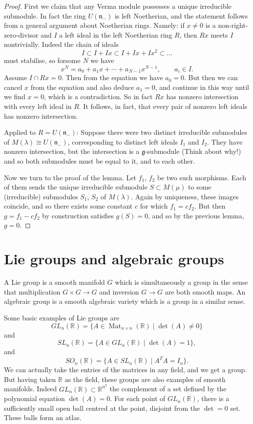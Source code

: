 \documentclass[12pt]{article}
\theoremstyle{plain}
\theoremstyle{definition}
\numberwithin{equation}{section}
\DeclareMathOperator{\Mat}{Mat}
\newcommand{\la}{\lambda}
\newcommand{\R}{\mathbb{R}}
\newcommand{\g}{\mathfrak{g}}
\newcommand{\n}{\mathfrak{n}}
\begin{document}
\begin{proof}
First we claim that any Verma module possesses a unique irreducible submodule. In fact the ring $U(\n_-)$ is left Noetherian, and the statement follows from a general argument about Noetherian rings. Namely: if $x \neq 0$ is a non-right-zero-divisor and $I$ a left ideal in the left Noetherian ring $R$, then $Rx$ meets $I$ nontrivially. Indeed the chain of ideals
\[
I \subset I + Ix \subset I + Ix + Ix^2 \subset \ldots
\]
must stabilise, so forsome $N$ we have
\[
x^N = a_0 + a_1 x + \cdots + a_{N-1} x^{N-1}, \qquad a_i \in I.
\]
Assume $I \cap Rx = 0$. Then from the equation we have $a_0 = 0$. But then we can cancel $x$ from the equation and also deduce $a_1 = 0$, and continue in this way until we find $x = 0$, which is a contradiction. So in fact $Rx$ has nonzero intersection with every left ideal in $R$. It follows, in fact, that every pair of nonzero left ideals has nonzero intersection.

Applied to $R = U(\n_-)$: Suppose there were two distinct irreducible submodules of $M(\la) \cong U(\n_-)$, corresponding to distinct left ideals $I_1$ and $I_2$. They have nonzero intersection, but the intersection is a $\g$-submodule (Think about why!) and so both submodules must be equal to it, and to each other.

Now we turn to the proof of the lemma. Let $f_1$, $f_2$ be two such morphisms. Each of them sends the unique irreducible submodule $S \subset M(\mu)$ to some (irreducible) submodules $S_1$, $S_2$ of $M(\la)$. Again by uniqueness, these images coincide, and so there exists some constant $c$ for which $f_1 = c f_2$. But then $g = f_1 - cf_2$ by construction satisfies $g(S) = 0$, and so by the previous lemma, $g = 0$.
\end{proof}





\section{Lie groups and algebraic groups}


A Lie group is a smooth manifold $G$ which is simultaneously a group in the sense that multiplication $G \times G \rightarrow G$ and inversion $G \rightarrow G$ are both smooth maps. An algebraic group is a smooth algebraic variety which is a group in a similar sense.


Some basic examples of Lie groups are
\[
GL_n(\R) = \{A \in \Mat_{n \times n}(\R) \mid \det(A) \neq 0\}
\]
and
\[
SL_n(\R) = \{A \in GL_n(\R) \mid \det(A) = 1\},
\]
and
\[
SO_n(\R) = \{A \in SL_n(\R) \mid A^T A = I_n\}.
\]
We can actually take the entries of the matrices in any field, and we get a group. But having taken $\R$ as the field, these groups are also examples of smooth manifolds. Indeed $GL_n(\R) \subset \R^{n^2}$ the complement of a set defined by the polynomial equation $\det(A) = 0$. For each point of $GL_n(\R)$, there is a sufficiently small open ball centred at the point, disjoint from the $\det = 0$ set. These balls form an atlas.
\end{document}
